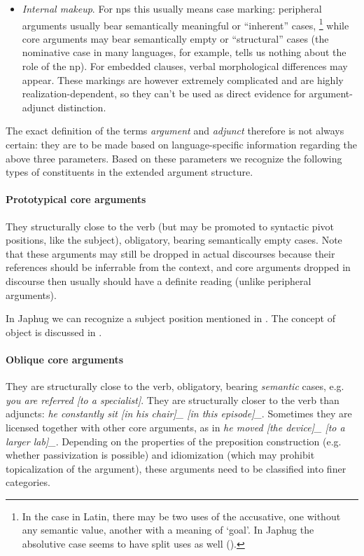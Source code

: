 \documentclass[a4paper, oneside, 12pt]{report}
\newcommand*{\term}[1]{\emph{#1}}
\newcommand{\form}[1]{\emph{#1}}
\newcommand{\translate}[1]{`#1'}
\begin{document}
\begin{itemize}
    \item \emph{Internal makeup}.
    For \acp{np} this usually means case marking:
    peripheral arguments usually bear semantically meaningful or ``inherent'' cases,%
    \footnote{
        In the case in Latin, there may be two uses of the accusative,
        one without any semantic value,
        another with a meaning of \translate{goal}.
        In Japhug the absolutive case seems to have split uses as well
        (). 
    }
    while core arguments may bear semantically empty or ``structural'' cases
    (the nominative case in many languages, for example,
    tells us nothing about the role of the \ac{np}).
    For embedded clauses, verbal morphological differences may appear.
    These markings are however extremely complicated and are highly realization-dependent,
    so they can't be used as direct evidence for argument-adjunct distinction.
\end{itemize}

The exact definition of the terms \term{argument} and \term{adjunct}
therefore is not always certain:
they are to be made based on language-specific information regarding the above three parameters.
Based on these parameters we recognize the following types 
of constituents in the extended argument structure.

\paragraph*{Prototypical core arguments}
They structurally close to the verb
(but may be promoted to syntactic pivot positions, like the subject),
obligatory, bearing semantically empty cases.
Note that these arguments may still be dropped in actual discourses
because their references should be inferrable from the context,
and core arguments dropped in discourse then usually should have a definite reading
(unlike peripheral arguments).

In Japhug we can recognize a subject position mentioned in .
The concept of object is discussed in .

\paragraph*{Oblique core arguments}
They are structurally close to the verb,
obligatory, bearing \emph{semantic} cases,
e.g. \form{you are referred [to a specialist]}.
They are structurally closer to the verb than adjuncts:
\form{he constantly sit [in his chair]_{} [in this episode]_{\text{adjunct}}}.
Sometimes they are licensed together with other core arguments,
as in \form{he moved [the device]_{} [to a larger lab]_{\text{oblique argument (goal)}}}.
Depending on the properties of the preposition construction
(e.g. whether passivization is possible)
and idiomization (which may prohibit topicalization of the argument),
these arguments need to be classified into finer categories.
\end{document}
